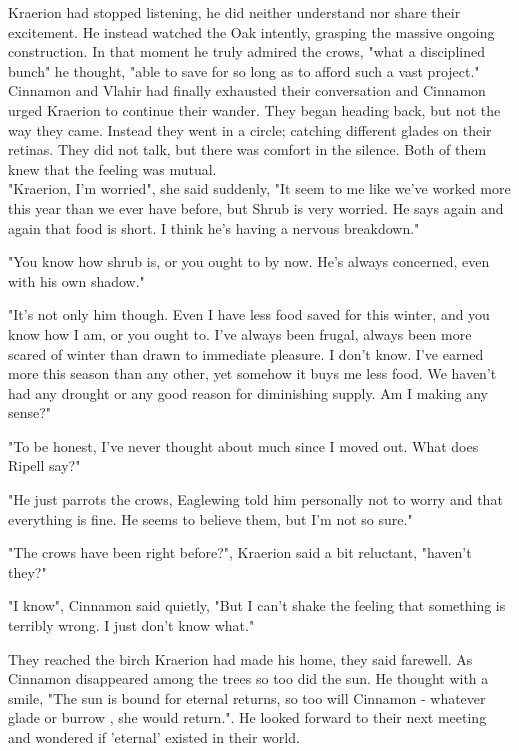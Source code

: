 \documentclass[smalldemyvopaper,11pt,twoside,onecolumn,openright,extrafontsizes]{memoir}
\begin{document}
Kraerion had stopped listening, he did neither understand nor share their excitement. He instead watched the Oak intently, grasping the massive ongoing construction. In that moment he truly admired the crows, "what a disciplined bunch" he thought, "able to save for so long as to afford such a vast project." \\

Cinnamon and Vlahir had finally exhausted their conversation and Cinnamon urged Kraerion to continue their wander. They began heading back, but not the way they came. Instead they went in a circle; catching different glades on their retinas. They did not talk, but there was comfort in the silence. Both of them knew that the feeling was mutual. \\

"Kraerion, I'm worried", she said suddenly, "It seem to me like we've worked more this year than we ever have before, but Shrub is very worried. He says again and again that food is short. I think he's having a nervous breakdown."

"You know how shrub is, or you ought to by now. He's always concerned, even with his own shadow."

"It's not only him though. Even I have less food saved for this winter, and you know how I am, or you ought to. I've always been frugal, always been more scared of winter than drawn to immediate pleasure. I don't know. I've earned more this season than any other, yet somehow it buys me less food. We haven't had any drought or any good reason for diminishing supply. Am I making any sense?"

"To be honest, I've never thought about much since I moved out. What does Ripell say?"

"He just parrots the crows, Eaglewing told him personally not to worry and that everything is fine. He seems to believe them, but I'm not so sure."

"The crows have been right before?", Kraerion said a bit reluctant, "haven't they?"

"I know", Cinnamon said quietly, "But I can't shake the feeling that something is terribly wrong. I just don't know what."

They reached the birch Kraerion had made his home, they said farewell. As Cinnamon disappeared among the trees so too did the sun. He thought with a smile, "The sun is bound for eternal returns, so too will Cinnamon - whatever glade or burrow , she would return.". He looked forward to their next meeting and wondered if 'eternal' existed in their world.      
\end{document}
